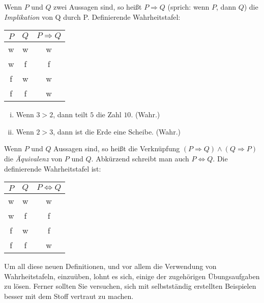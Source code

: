 \begin{mydef}
Wenn $P$ und $Q$ zwei Aussagen sind, so heißt $P \Rightarrow Q$
(sprich: wenn $P$, dann $Q$) die \textit{Implikation} von Q durch P.
Definierende Wahrheitstafel:

\begin{table}[H]
\centering
\begin{tabular}{c|c|c}
$P$ & $Q$ & $P \Rightarrow Q$ \\ \hline
w   & w   & w \\
w   & f   & f \\
f   & w   & w \\
f   & f   & w
\end{tabular}
\end{table}
\end{mydef}


\begin{example}
\begin{enumerate}[(i)]
\item Wenn $ 3 > 2$, dann teilt $5$ die Zahl $10$. (Wahr.)
\item Wenn $2 > 3$, dann ist die Erde eine Scheibe. (Wahr.)
\end{enumerate}
\end{example}




\begin{mydef}
Wenn $P$ und $Q$ Aussagen sind, so heißt die Verknüpfung
$(P \Rightarrow Q) \wedge (Q \Rightarrow P)$ die \textit{Äquivalenz} von
$P$ und $Q$.
Abkürzend schreibt man auch $P \iff Q$.
Die definierende Wahrheitstafel ist:

\begin{table}[H]
\centering
\begin{tabular}{c|c|c}
$P$ & $Q$ & $P \iff Q$ \\ \hline
w   & w   & w \\
w   & f   & f \\
f   & w   & f \\
f   & f   & w
\end{tabular}
\end{table}
\end{mydef}

\vspace*{3em}
Um all diese neuen Definitionen, und vor allem die Verwendung von
Wahrheitstafeln, einzuüben, lohnt es sich, einige der zugehörigen
Übungsaufgaben zu lösen.
Ferner sollten Sie versuchen, sich mit selbstständig erstellten Beispielen
besser mit dem Stoff vertraut zu machen.
